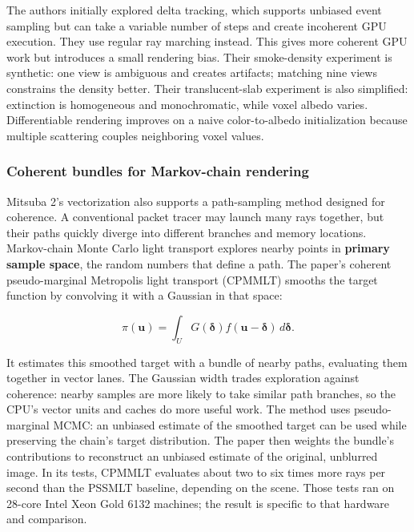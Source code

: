 The authors initially explored delta tracking, which supports unbiased event sampling but can take a variable number of steps and create incoherent GPU execution. They use regular ray marching instead. This gives more coherent GPU work but introduces a small rendering bias. Their smoke-density experiment is synthetic: one view is ambiguous and creates artifacts; matching nine views constrains the density better. Their translucent-slab experiment is also simplified: extinction is homogeneous and monochromatic, while voxel albedo varies. Differentiable rendering improves on a naive color-to-albedo initialization because multiple scattering couples neighboring voxel values.

\subsubsection{Coherent bundles for Markov-chain rendering}\label{03-visual-computing-i-ch011-coherent-bundles-for-markov-chain-rendering}

\hypertarget{03-visual-computing-i-ch011-coherent-bundles-for-markov-chain-rendering}{}

Mitsuba 2's vectorization also supports a path-sampling method designed for coherence. A conventional packet tracer may launch many rays together, but their paths quickly diverge into different branches and memory locations. Markov-chain Monte Carlo light transport explores nearby points in \textbf{primary sample space}, the random numbers that define a path. The paper's coherent pseudo-marginal Metropolis light transport (CPMMLT) smooths the target function by convolving it with a Gaussian in that space:

\[\pi(\mathbf{u})=\int_U G(\boldsymbol\delta)f(\mathbf{u}-\boldsymbol\delta)\,d\boldsymbol\delta.\]

It estimates this smoothed target with a bundle of nearby paths, evaluating them together in vector lanes. The Gaussian width trades exploration against coherence: nearby samples are more likely to take similar path branches, so the CPU's vector units and caches do more useful work. The method uses pseudo-marginal MCMC: an unbiased estimate of the smoothed target can be used while preserving the chain's target distribution. The paper then weights the bundle's contributions to reconstruct an unbiased estimate of the original, unblurred image. In its tests, CPMMLT evaluates about two to six times more rays per second than the PSSMLT baseline, depending on the scene. Those tests ran on 28-core Intel Xeon Gold 6132 machines; the result is specific to that hardware and comparison.

